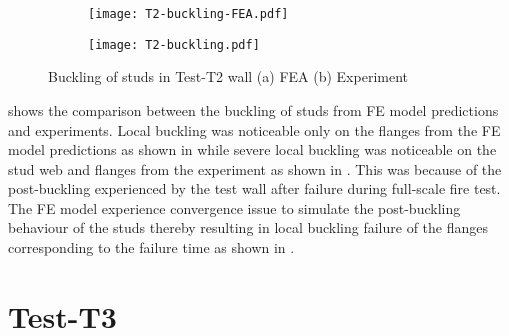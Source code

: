 \begin{figure}[!htbp]
	\centering
	\begin{subfigure}[b]{0.8\textwidth}
		\centering
		\texttt{[image: T2-buckling-FEA.pdf]}
		\caption{}
		\label{subfig:T2-buckling-FEA}
	\end{subfigure}
	\begin{subfigure}[b]{0.3\textwidth}
		\centering
		\texttt{[image: T2-buckling.pdf]}
		\caption{}
		\label{subfig:T2-buckling-FEA-Exp}
	\end{subfigure}
	   \caption{Buckling of studs in Test-T2 wall (a) FEA (b) Experiment}
	   \label{fig:T2-buckling-FE-vs-Exp}
\end{figure} 

 shows the comparison between the buckling of studs from FE model predictions and experiments. Local buckling was noticeable only on the flanges from the FE model predictions as shown in  while severe local buckling was noticeable on the stud web and flanges from the experiment as shown in . This was because of the post-buckling experienced by the test wall after failure during full-scale fire test. The FE model experience convergence issue to simulate the post-buckling behaviour of the studs thereby resulting in local buckling failure of the flanges corresponding to the failure time as shown in .

\section*{Test-T3}

